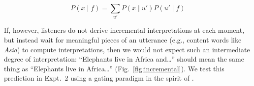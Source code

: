 \documentclass[10pt,letterpaper]{article}
\begin{document}
\begin{equation}
P(x \mid f) = \sum_{u'} P(x \mid u') P(u' \mid f) 
\label{eq:L0a}
\end{equation}

If, however, listeners do not derive incremental interpretations at each moment, but instead wait for meaningful pieces of an utterance (e.g., content words like \emph{Asia}) to compute interpretations, then we would not expect such an intermediate degree of interpretation: ``Elephants live in Africa and\ldots'' should mean the same thing as ``Elephants live in Africa\ldots'' (Fig.~\ref{fig:incremental}). 
We test this prediction in Expt.~2 using a gating paradigm in the spirit of .


\end{document}
